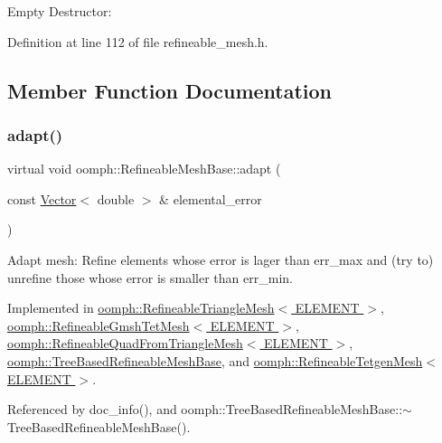 Empty Destructor\+: 



Definition at line 112 of file refineable\+\_\+mesh.\+h.



\subsection{Member Function Documentation}
\mbox{\label{classoomph_1_1RefineableMeshBase_aabe38fc56f2f12e91f2a2e8a4cf663b0}} 
\subsubsection{\texorpdfstring{adapt()}{adapt()}}
{\footnotesize\ttfamily virtual void oomph\+::\+Refineable\+Mesh\+Base\+::adapt (\begin{DoxyParamCaption}\item[{const \hyperlink{classoomph_1_1Vector}{Vector}$<$ double $>$ \&}]{elemental\+\_\+error }\end{DoxyParamCaption})\hspace{0.3cm}{\ttfamily [pure virtual]}}



Adapt mesh\+: Refine elements whose error is lager than err\+\_\+max and (try to) unrefine those whose error is smaller than err\+\_\+min. 



Implemented in \hyperlink{classoomph_1_1RefineableTriangleMesh_affc156d32aa40f84479e223f1217ebed}{oomph\+::\+Refineable\+Triangle\+Mesh$<$ E\+L\+E\+M\+E\+N\+T $>$}, \hyperlink{classoomph_1_1RefineableGmshTetMesh_ad3ee00690d125ab8211f64d5c85dd3b9}{oomph\+::\+Refineable\+Gmsh\+Tet\+Mesh$<$ E\+L\+E\+M\+E\+N\+T $>$}, \hyperlink{classoomph_1_1RefineableQuadFromTriangleMesh_a7d2efa292dd5dd4930e661fd32e42eec}{oomph\+::\+Refineable\+Quad\+From\+Triangle\+Mesh$<$ E\+L\+E\+M\+E\+N\+T $>$}, \hyperlink{classoomph_1_1TreeBasedRefineableMeshBase_ac98d4120b99d5c6cbcf7225a9ee5648d}{oomph\+::\+Tree\+Based\+Refineable\+Mesh\+Base}, and \hyperlink{classoomph_1_1RefineableTetgenMesh_ad75ff5f1e088e611311c3f6a30feea5b}{oomph\+::\+Refineable\+Tetgen\+Mesh$<$ E\+L\+E\+M\+E\+N\+T $>$}.



Referenced by doc\+\_\+info(), and oomph\+::\+Tree\+Based\+Refineable\+Mesh\+Base\+::$\sim$\+Tree\+Based\+Refineable\+Mesh\+Base().

